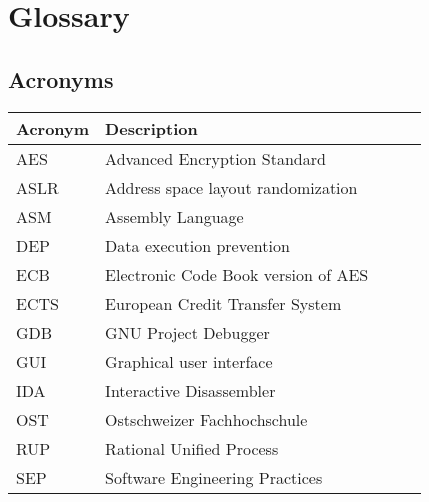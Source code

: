 \chapter{Glossary}
\section*{Acronyms}
\begin{table}[H]
    \begin{tabular}{|lp{0.815\linewidth}|}
    \hline
    \textbf{Acronym} & \textbf{Description}\\
    \hline
    \hline
    AES          & Advanced Encryption Standard         \\
    ASLR         & Address space layout randomization         \\
    ASM          & Assembly Language         \\
    DEP          & Data execution prevention         \\
    ECB          & Electronic Code Book version of AES         \\
    ECTS         & European Credit Transfer System         \\
    GDB          & GNU Project Debugger        \\
    GUI          & Graphical user interface         \\
    IDA          & Interactive Disassembler         \\
    OST          & Ostschweizer Fachhochschule         \\
    RUP          & Rational Unified Process         \\
    SEP          & Software Engineering Practices \\
    \hline
    \end{tabular}
\end{table}

